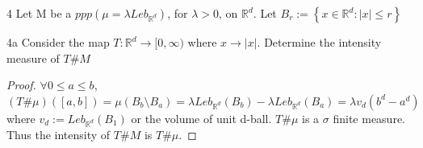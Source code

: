 \documentclass{article}
\newcommand{\R}{\mathbb{R}}
\newcommand{\abs}[1]{\left\lvert #1\right\rvert}
\begin{document}
\bigskip

\begin{PROB}{4}\label{Problem 4.}
    Let M be a $p p p(\mu = \lambda Leb_{\R^d})$, for $\lambda> 0$, on $\R^d$. Let $B_r := \left\{ x \in \R^d : \abs{x} \leq r \right\}$  
\end{PROB}
\begin{claim}{4a}\label{Claim 4a.}
    Consider the map $T: \R^d \to [0, \infty)$ where $x \to \abs{x}$. Determine the intensity measure of $T \# M$   
\end{claim}
\begin{proof}
    $\forall 0 \leq a \leq b$, $(T \# \mu)([a, b]) = \mu(B_b \setminus B_a) = \lambda Leb_{\R^d}(B_b) - \lambda Leb_{\R^d}(B_a) = \lambda v_d (b^d - a^d)$ where $v_d := Leb_{\R^d}(B_1)$ or the volume of unit d-ball. $T \# \mu$ is a $\sigma$ finite measure. Thus the intensity of $T \# M$ is $T \# \mu$.         
\end{proof}
\end{document}

